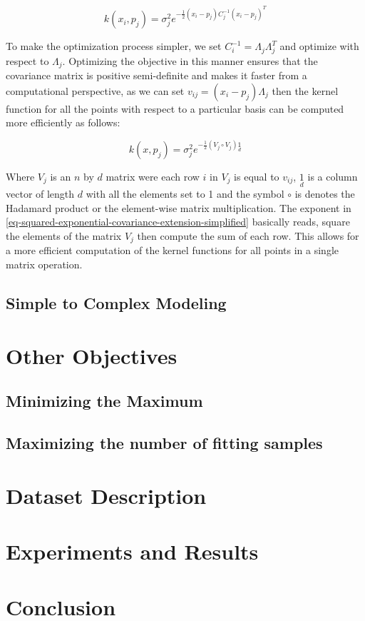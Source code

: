 \documentclass[a4paper,12pt]{article}
\begin{document}
\begin{equation}
\label{eq-squared-exponential-covariance-extension}
k(x_{i},p_{j}) = \sigma_{j}^{2}e^{-\frac{1}{2}\left(x_{i}-p_{j}\right)C_{j}^{-1}\left(x_{i}-p_{j}\right)^{T}}
\end{equation}

To make the optimization process simpler, we set $C_{i}^{-1}=\Lambda_{j}\Lambda_{j}^{T}$ and optimize with respect to $\Lambda_{j}$. Optimizing the objective in this manner ensures that the covariance matrix is positive semi-definite and makes it faster from a computational perspective, as we can set $v_{ij}=\left(x_{i}-p_{j}\right)\Lambda_{j}$ then the kernel function for all the points with respect to a particular basis can be computed more efficiently as follows:

\begin{equation}
\label{eq-squared-exponential-covariance-extension-simplified}
k(x,p_{j}) = \sigma_{j}^{2}e^{-\frac{1}{2}\left(V_{j}\circ V_{j}\right)\underset{d}{1}}
\end{equation}

Where $V_{j}$ is an $n$ by $d$ matrix were each row $i$ in $V_{j}$ is equal to $v_{ij}$, $\underset{d}{1}$ is a column vector of length $d$ with all the elements set to 1 and the symbol $\circ$ is denotes the Hadamard product or the element-wise matrix multiplication. The exponent in \eqref{eq-squared-exponential-covariance-extension-simplified} basically reads, square the elements of the matrix $V_{j}$ then compute the sum of each row. This allows for a more efficient computation of the kernel functions for all points in a single matrix operation. 

\subsection{Simple to Complex Modeling}

\section{Other Objectives}
\label{sec-other-objectives}

\subsection{Minimizing the Maximum}
\subsection{Maximizing the number of fitting samples}

\section{Dataset Description}
\label{sec-dataset}

\section{Experiments and Results}
\label{sec-experiment}

\section{Conclusion}
\label{sec-conclusion}
\end{document}
